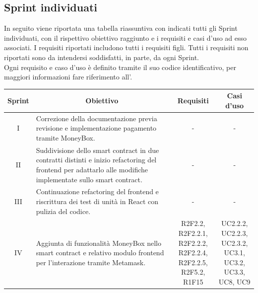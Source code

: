 \subsection{Sprint individuati} \label{subsection:sprint}
In seguito viene riportata una tabella riassuntiva con indicati tutti gli Sprint\glo{} individuati, con il rispettivo obiettivo raggiunto e i requisiti e casi d'uso ad esso associati.
I requisiti riportati includono tutti i requisiti figli. Tutti i requisiti non riportati sono da intendersi soddisfatti, in parte, da
ogni Sprint\glo{}. \\
Ogni requisito e caso d'uso è definito tramite il suo codice identificativo, per maggiori informazioni fare riferimento all'\docNameVersionAdR{}.

\begin{table}[H]
  \centering
  \renewcommand{\arraystretch}{1.8}
  \begin{tabular}{c|p{6cm}|c|c}
    \rowcolor[HTML]{125E28}
    \color[HTML]{FFFFFF}\textbf{Sprint}
         & \multicolumn{1}{c}{\color[HTML]{FFFFFF}\textbf{Obiettivo}}
         & \multicolumn{1}{c}{\color[HTML]{FFFFFF}\textbf{Requisiti}}
         & \multicolumn{1}{c}{\color[HTML]{FFFFFF}\textbf{Casi d'uso}}                                                                                                                                                                                \\
    \hline
    I    & Correzione della documentazione previa revisione \RTB{} e implementazione pagamento tramite MoneyBox\glo{}.                                                                           & -                                  & -             \\
    II   & Suddivisione dello smart contract\glo{} in due contratti distinti e inizio refactoring\glo{} del frontend\glo{} per adattarlo alle modifiche implementate sullo smart contract\glo{}. & -                                  & -             \\
    III  & Continuazione refactoring\glo{} del frontend\glo{} e riscrittura dei test di unità in React\glo{} con pulizia del codice.                                                             & -                                  & -             \\
    IV   & Aggiunta di funzionalità MoneyBox\glo{} nello smart contract\glo{} e relativo modulo frontend\glo{} per l'interazione tramite Metamask\glo{}.                                         & \Shortunderstack{R2F2.2, R2F2.2.1,                 \\R2F2.2.2, R2F2.2.4,\\R2F2.2.5, R2F5.2,\\R1F15\\} & \Shortunderstack{UC2.2.2, UC2.2.3,\\UC2.3.2, UC3.1,\\UC3.2, UC3.3,\\UC8, UC9\\}\\

\end{tabular}
\end{table}
